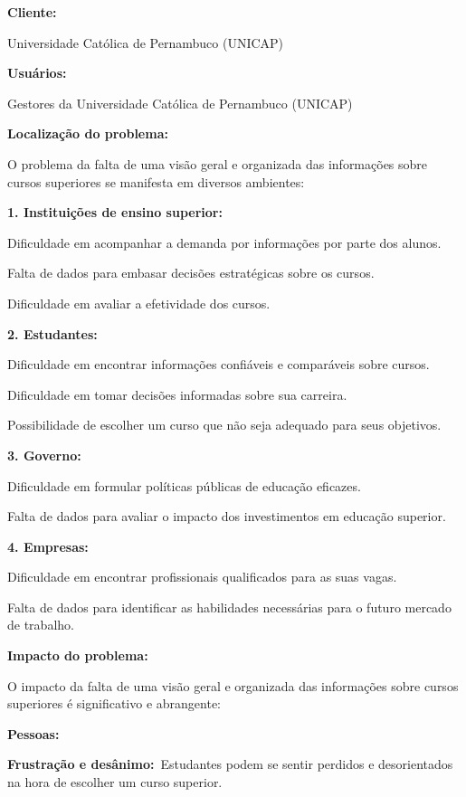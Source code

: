 \documentclass[a4paper]{article}
\begin{document}
\textbf{Cliente: }

Universidade Católica de Pernambuco (UNICAP)


\bigskip

\textbf{Usuários:}

Gestores da Universidade Católica de Pernambuco (UNICAP)


\bigskip

\newline
\textbf{Localização do problema:}

O problema da falta de uma visão geral e organizada das informações sobre cursos superiores se manifesta em diversos
ambientes:

\textbf{1. Instituições de ensino superior:}

Dificuldade em acompanhar a demanda por informações por parte dos alunos.

Falta de dados para embasar decisões estratégicas sobre os cursos.

Dificuldade em avaliar a efetividade dos cursos.

\textbf{2. Estudantes:}

Dificuldade em encontrar informações confiáveis e comparáveis sobre cursos.

Dificuldade em tomar decisões informadas sobre sua carreira.

Possibilidade de escolher um curso que não seja adequado para seus objetivos.


\bigskip

\textbf{3. Governo:}

Dificuldade em formular políticas públicas de educação eficazes.

Falta de dados para avaliar o impacto dos investimentos em educação superior.

\textbf{4. Empresas:}

Dificuldade em encontrar profissionais qualificados para as suas vagas.

Falta de dados para identificar as habilidades necessárias para o futuro mercado de trabalho.

\textbf{Impacto do problema:}

O impacto da falta de uma visão geral e organizada das informações sobre cursos superiores é significativo e abrangente:

\textbf{Pessoas:}

\textbf{Frustração e desânimo:} Estudantes podem se sentir perdidos e desorientados na hora de escolher um curso
superior.
\end{document}
